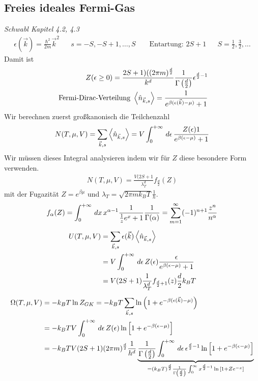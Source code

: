 \subsection*{Freies ideales Fermi-Gas}
\emph{Schwabl Kapitel 4.2, 4.3}
%
\begin{align*}
  \epsilon(\vec{k}) = \frac{\hbar^2}{2 m} \vec{k}^2 && s = -S, -S + 1, \ldots , S
  && \text{ Entartung: } 2 S + 1 && S = \frac{1}{2} , \frac{3}{2}, \ldots
\end{align*}
%
Damit ist
%
\begin{align*}
  Z(\epsilon \ge 0) = \frac{2 S + 1) ((2 \pi m)^{\frac{d}{2}}}{k^d}
  \frac{1}{\Gamma\left( \frac{d}{2} \right)} \epsilon^{\frac{d}{2} - 1} \\
  \text{ Fermi-Dirac-Verteilung } \Braket{ \hat{n}_{\vec{k},s}} = 
  \frac{1}{e^{\beta(\epsilon(\vec{k}) - \mu)} + 1}
\end{align*}
%
Wir berechnen zuerst großkanonisch die Teilchenzahl
%
\begin{align*}
  N(T, \mu, V) = \sum_{\vec{k},s}^{} \Braket{\hat{n}_{\vec{k},s}} = 
  V \int_{0}^{ + \infty} \,d\epsilon\, \frac{Z(\epsilon) 1}{e^{\beta(\epsilon-\mu)} + 1}
\end{align*}
%
Wir müssen dieses Integral analysieren indem wir für $Z$ diese besondere Form
verwenden.
%
\begin{align*}
  N(T, \mu, V)= \frac{V(2 S + 1}{\lambda_T^d} f_{\frac{d}{2}}(Z)
\end{align*}
%
mit der Fugazität $Z = e^{\beta \mu}$ und $\lambda_T = \sqrt{2 \pi m k_B T}
\frac{1}{h}$. 
%
\begin{align*}
  f_\alpha(Z) = \int_{0 }^{ + \infty} \,dx\, x^{\alpha-1} \frac{1}{\frac{1}{z} e^x + 1} 
  \frac{1}{\Gamma(\alpha)} = 
  \sum_{m=1}^{\infty} (-1)^{n+1} \frac{z^n}{n^\alpha}
\end{align*}
%
%
\begin{align*}
  U(T, \mu, V) & = \sum_{\vec{k},s}^{} \epsilon(\vec{k}) \Braket{\hat{n}_{\vec{k},s}} \\
               & = V \int_{0}^{ + \infty} \,d\epsilon\, Z(\epsilon) 
  \frac{\epsilon}{e^{\beta(\epsilon-\mu)} + 1} \\
  &  = V ( 2 S + 1) 
  \frac{1}{\lambda_T^d} f_{\frac{d}{2} + 1} (z) 
  \frac{d}{2} k_B T
\end{align*}
%
%
\begin{align*}
  \Omega(T, \mu, V) & = - k_B T \ln{Z_{GK}} = 
  - k_B T \sum_{\vec{k},s}^{} \ln{\left( 1 + e^{-\beta(\epsilon(\vec{k}) - \mu)} \right)} \\
  & = - k_B T V \int_{0}^{+ \infty} \,d\epsilon\, Z(\epsilon) \ln{\left[ 1 + e^{-\beta(\epsilon- \mu)} \right]} \\
  & = - k_B T V (2  S + 1)
  (2 \pi m )^{\frac{d}{2}} \frac{1}{h^d} \underbrace{\frac{1}{\Gamma\left( \frac{d}{2} \right)}
  \int_{0}^{+ \infty} \,d\epsilon\, \epsilon^{\frac{d}{2} - 1}\ln{
\left[ 1 + e^{- \beta (\epsilon - \mu)} \right]}}_{ = (k_B T) ^{\frac{d}{2}}
\frac{1}{\Gamma\left( \frac{d}{2} \right)}  \int_{0}^{\infty} x^{\frac{d}{2} - 1}
\ln{\left[ 1 + Z e^{-x} \right]}}
\end{align*}
